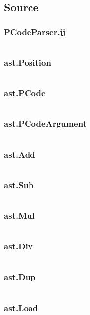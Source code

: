 \documentclass[11pt, numbers=endperiod, parskip=half]{scrartcl}
\begin{document}
\begin{landscape}
\section{Source}
\subsubsection{PCodeParser.jj}
\inputminted{java}{RPN/src/PCodeParser.jj}

\subsubsection{ast.Position}
\inputminted{java}{RPN/src/ast/Position.java}
\subsubsection{ast.PCode}
\inputminted{java}{RPN/src/ast/PCode.java}
\subsubsection{ast.PCodeArgument}
\inputminted{java}{RPN/src/ast/PCodeArgument.java}

\subsubsection{ast.Add}
\inputminted{java}{RPN/src/ast/Add.java}
\subsubsection{ast.Sub}
\inputminted{java}{RPN/src/ast/Sub.java}
\subsubsection{ast.Mul}
\inputminted{java}{RPN/src/ast/Mul.java}
\subsubsection{ast.Div}
\inputminted{java}{RPN/src/ast/Div.java}
\subsubsection{ast.Dup}
\inputminted{java}{RPN/src/ast/Dup.java}

\subsubsection{ast.Load}
\inputminted{java}{RPN/src/ast/Load.java}

\end{landscape}
\end{document}
